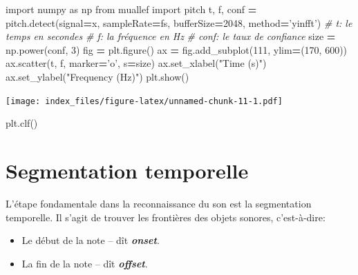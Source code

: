 \documentclass[]{article}
\newenvironment{Shaded}{\begin{snugshade}}{\end{snugshade}}
\newcommand{\CommentTok}[1]{\textcolor[rgb]{0.56,0.35,0.01}{\textit{#1}}}
\newcommand{\DecValTok}[1]{\textcolor[rgb]{0.00,0.00,0.81}{#1}}
\newcommand{\ImportTok}[1]{#1}
\newcommand{\NormalTok}[1]{#1}
\newcommand{\OperatorTok}[1]{\textcolor[rgb]{0.81,0.36,0.00}{\textbf{#1}}}
\newcommand{\StringTok}[1]{\textcolor[rgb]{0.31,0.60,0.02}{#1}}
\providecommand{\tightlist}{%
  \setlength{\itemsep}{0pt}\setlength{\parskip}{0pt}}
\begin{document}
\begin{Shaded}
\begin{Highlighting}[]
\ImportTok{import}\NormalTok{ numpy }\ImportTok{as}\NormalTok{ np}
\ImportTok{from}\NormalTok{ muallef }\ImportTok{import}\NormalTok{ pitch}
\NormalTok{t, f, conf }\OperatorTok{=}\NormalTok{ pitch.detect(signal}\OperatorTok{=}\NormalTok{x, sampleRate}\OperatorTok{=}\NormalTok{fs, bufferSize}\OperatorTok{=}\DecValTok{2048}\NormalTok{, method}\OperatorTok{=}\StringTok{'yinfft'}\NormalTok{)}
\CommentTok{# t: le temps en secondes}
\CommentTok{# f: la fréquence en Hz}
\CommentTok{# conf: le taux de confiance}
\NormalTok{size }\OperatorTok{=}\NormalTok{ np.power(conf, }\DecValTok{3}\NormalTok{)}
\NormalTok{fig }\OperatorTok{=}\NormalTok{ plt.figure()}
\NormalTok{ax }\OperatorTok{=}\NormalTok{ fig.add_subplot(}\DecValTok{111}\NormalTok{, ylim}\OperatorTok{=}\NormalTok{(}\DecValTok{170}\NormalTok{, }\DecValTok{600}\NormalTok{))}
\NormalTok{ax.scatter(t, f, marker}\OperatorTok{=}\StringTok{'o'}\NormalTok{, s}\OperatorTok{=}\NormalTok{size)}
\NormalTok{ax.set_xlabel(}\StringTok{"Time (s)"}\NormalTok{)}
\NormalTok{ax.set_ylabel(}\StringTok{"Frequency (Hz)"}\NormalTok{)}
\NormalTok{plt.show()}
\end{Highlighting}
\end{Shaded}

\texttt{[image: index\_files/figure-latex/unnamed-chunk-11-1.pdf]}

\begin{Shaded}
\begin{Highlighting}[]
\NormalTok{plt.clf()}
\end{Highlighting}
\end{Shaded}

\pagebreak

\hypertarget{segmentation-temporelle}{%
\section{Segmentation temporelle}\label{segmentation-temporelle}}

L'étape fondamentale dans la reconnaissance du son est la segmentation
temporelle. Il s'agit de trouver les frontières des objets sonores,
c'est-à-dire:

\begin{itemize}
\tightlist
\item
  Le début de la note -- dît \textbf{\emph{onset}}.
\item
  La fin de la note -- dît \textbf{\emph{offset}}.
\end{itemize}
\end{document}
